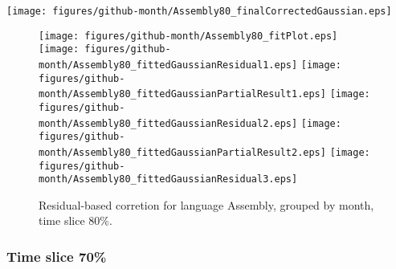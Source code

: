\begin{center}
{\texttt{[image: figures/github-month/Assembly80\_finalCorrectedGaussian.eps]}}
\end{center}

\FloatBarrier

\begin{figure}[t]
\centering
{}
{\texttt{[image: figures/github-month/Assembly80\_fitPlot.eps]}}
{\texttt{[image: figures/github-month/Assembly80\_fittedGaussianResidual1.eps]}}
{\texttt{[image: figures/github-month/Assembly80\_fittedGaussianPartialResult1.eps]}}
{\texttt{[image: figures/github-month/Assembly80\_fittedGaussianResidual2.eps]}}
{\texttt{[image: figures/github-month/Assembly80\_fittedGaussianPartialResult2.eps]}}
{\texttt{[image: figures/github-month/Assembly80\_fittedGaussianResidual3.eps]}}
\caption{Residual-based corretion for language Assembly, grouped by month, time slice 80\%.}
\end{figure}


\FloatBarrier


\subsubsection{Time slice 70\%}

